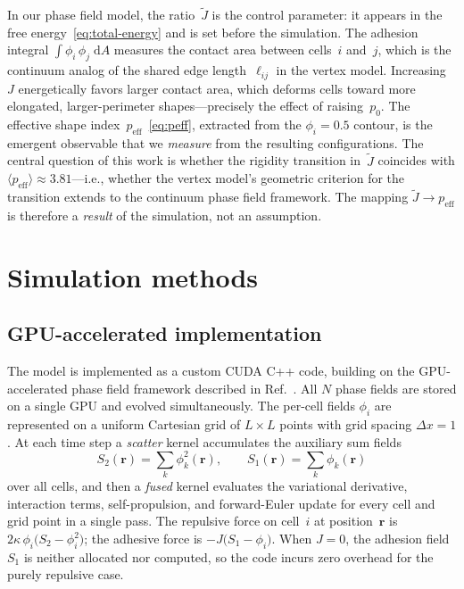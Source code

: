 \documentclass[aps,pre,twocolumn,superscriptaddress,longbibliography]{revtex4-2}
\newcommand{\dd}{\mathrm{d}}               %
\newcommand{\peff}{p_{\mathrm{eff}}}       %
\newcommand{\Jk}{\tilde{J}}                %
\newcommand{\phii}{\phi_i}                 %
\newcommand{\phij}{\phi_j}                 %
\begin{document}
In our phase field model, the ratio~$\Jk$ is the control parameter: it
appears in the free energy~\eqref{eq:total-energy} and is set before the
simulation.  The adhesion integral $\int\!\phii\,\phij\;\dd A$ measures the
contact area between cells~$i$ and~$j$, which is the continuum analog of
the shared edge length~$\ell_{ij}$ in the vertex model.  Increasing~$J$
energetically favors larger contact area, which deforms cells toward more
elongated, larger-perimeter shapes---precisely the effect of raising~$p_0$.
The effective shape index~$\peff$~\eqref{eq:peff}, extracted from the
$\phii = 0.5$ contour, is the emergent observable that we \emph{measure}
from the resulting configurations.  The central question of this work is
whether the rigidity transition in~$\Jk$ coincides with
$\langle\peff\rangle \approx 3.81$---i.e., whether the vertex model's
geometric criterion for the transition extends to the continuum phase field
framework.  The mapping $\Jk \to \peff$ is therefore a \emph{result} of
the simulation, not an assumption.


\section{Simulation methods}
\label{sec:methods}

\subsection{GPU-accelerated implementation}
\label{sec:methods:gpu}

The model is implemented as a custom CUDA C++ code, building on the
GPU-accelerated phase field framework described in
Ref.~\cite{Silber2025}.  All $N$ phase fields are
stored on a single GPU and evolved simultaneously.  The per-cell fields
$\phii$ are represented on a uniform Cartesian grid of $L \times L$ points
with grid spacing $\Delta x = 1$.  At each time step a \emph{scatter} kernel
accumulates the auxiliary sum fields
%
\begin{equation}
  S_2(\bm{r}) = \textstyle\sum_k \phi_k^2(\bm{r}), \qquad
  S_1(\bm{r}) = \textstyle\sum_k \phi_k(\bm{r})
  \label{eq:sum-fields}
\end{equation}
%
over all cells, and then a \emph{fused} kernel evaluates the variational
derivative, interaction terms, self-propulsion, and forward-Euler update for
every cell and grid point in a single pass.  The repulsive force on cell~$i$
at position~$\bm{r}$ is $2\kappa\,\phii\bigl(S_2 - \phii^2\bigr)$; the
adhesive force is $-J\bigl(S_1 - \phii\bigr)$.  When $J = 0$, the adhesion
field~$S_1$ is neither allocated nor computed, so the code incurs zero overhead
for the purely repulsive case.
\end{document}
